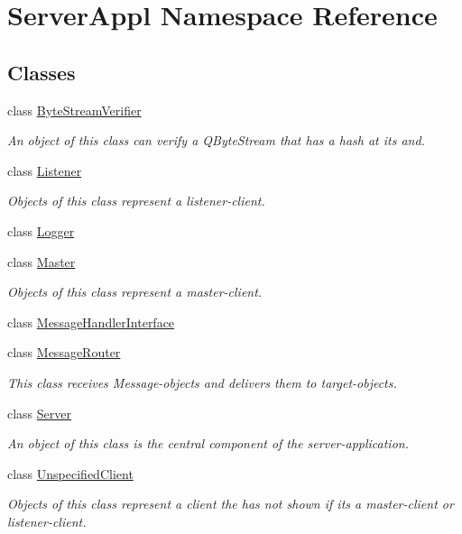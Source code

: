 \hypertarget{namespace_server_appl}{}\section{Server\+Appl Namespace Reference}
\label{namespace_server_appl}
\subsection*{Classes}
\begin{DoxyCompactItemize}
\item 
class \hyperlink{class_server_appl_1_1_byte_stream_verifier}{Byte\+Stream\+Verifier}
\begin{DoxyCompactList}\small\item\em An object of this class can verify a Q\+Byte\+Stream that has a hash at its and. \end{DoxyCompactList}\item 
class \hyperlink{class_server_appl_1_1_listener}{Listener}
\begin{DoxyCompactList}\small\item\em Objects of this class represent a listener-\/client. \end{DoxyCompactList}\item 
class \hyperlink{class_server_appl_1_1_logger}{Logger}
\item 
class \hyperlink{class_server_appl_1_1_master}{Master}
\begin{DoxyCompactList}\small\item\em Objects of this class represent a master-\/client. \end{DoxyCompactList}\item 
class \hyperlink{class_server_appl_1_1_message_handler_interface}{Message\+Handler\+Interface}
\item 
class \hyperlink{class_server_appl_1_1_message_router}{Message\+Router}
\begin{DoxyCompactList}\small\item\em This class receives Message-\/objects and delivers them to target-\/objects. \end{DoxyCompactList}\item 
class \hyperlink{class_server_appl_1_1_server}{Server}
\begin{DoxyCompactList}\small\item\em An object of this class is the central component of the server-\/application. \end{DoxyCompactList}\item 
class \hyperlink{class_server_appl_1_1_unspecified_client}{Unspecified\+Client}
\begin{DoxyCompactList}\small\item\em Objects of this class represent a client the has not shown if its a master-\/client or listener-\/client. \end{DoxyCompactList}\end{DoxyCompactItemize}
